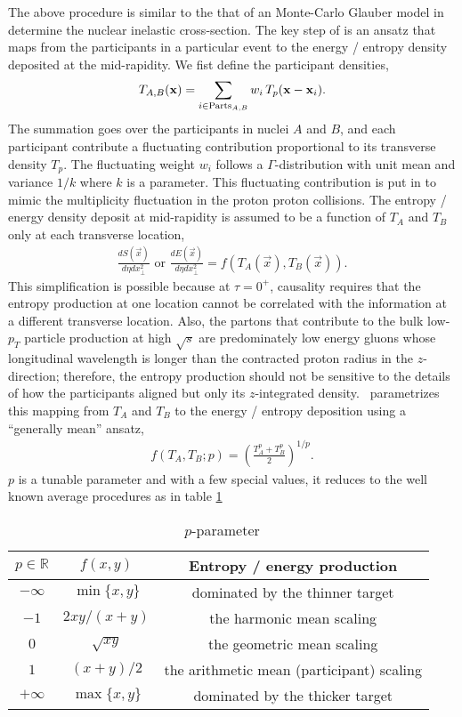 The above procedure is similar to the that of an Monte-Carlo Glauber model in determine the nuclear inelastic cross-section.
The key step of \trento is an ansatz that maps from the participants in a particular event to the energy / entropy density deposited at the mid-rapidity.
We fist define the participant densities,
\begin{equation}
T_{A, B}(\mathbf x) = \sum_{i\in \textrm{Parts}_{A, B}} w_i\, T_p(\mathbf x - \mathbf x_i).
\end{equation}
The summation goes over the participants in nuclei $A$ and $B$, and each participant contribute a fluctuating contribution proportional to its transverse density $T_p$.
The fluctuating weight $w_i$ follows a $\Gamma$-distribution with unit mean and variance $1/k$ where $k$ is a parameter.
This fluctuating contribution is put in to mimic the multiplicity fluctuation in the proton proton collisions.
The entropy / energy density deposit at mid-rapidity is assumed to be a function of $T_A$ and $T_B$ only at each transverse location,
\begin{eqnarray}
\frac{dS(\vec{x})}{d\eta dx_\perp^2} \textrm{ or } \frac{dE(\vec{x})}{d\eta dx_\perp^2} = f(T_A(\vec{x}), T_B(\vec{x})).
\end{eqnarray}
This simplification is possible because at $\tau=0^+$, causality requires that the entropy production at one location cannot be correlated with the information at a different transverse location. 
Also, the partons that contribute to the bulk low-$p_T$ particle production at high $\sqrt{s}$ are predominately low energy gluons whose longitudinal wavelength is longer than the contracted proton radius in the $z$-direction; therefore, the entropy production should not be sensitive to the details of how the participants aligned but only its $z$-integrated density.
\trento\ parametrizes this mapping from $T_A$ and $T_B$ to the energy / entropy deposition using a ``generally mean'' ansatz,
\begin{eqnarray}
f(T_A, T_B; p) = \left(\frac{T_A^p + T_B^p}{2}\right)^{1/p}.
\end{eqnarray}
$p$ is a tunable parameter and with a few special values, it reduces to the well known average procedures as in table \ref{tab:trento-p}
\begin{table}
\centering
\caption{\trento\ $p$-parameter}\label{tab:trento-p}
\begin{tabular}{ccc}
\hline
$p\in \mathbb{R}$ & $f(x, y)$ & Entropy / energy production\\
\hline
$-\infty$ & $\min\{x, y\}$ &  dominated by the thinner target\\
$-1$ & $2xy/(x+y)$ &   the harmonic mean scaling\\
$0$ & $\sqrt{xy}$ &  the geometric mean scaling\\
$1$ & $(x+y)/2$ &  the arithmetic mean (participant) scaling\\
$+\infty$ & $\max\{x, y\}$ &  dominated by the thicker target \\
\hline
\end{tabular}
\end{table}
